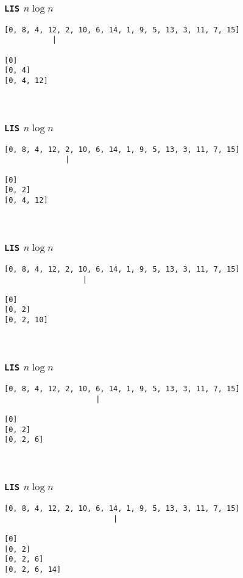 \documentclass{beamer}
\begin{document}
\begin{frame}[fragile]
	\frametitle{\texttt{LIS} $n\log n$}
\begin{verbatim}
[0, 8, 4, 12, 2, 10, 6, 14, 1, 9, 5, 13, 3, 11, 7, 15]
           |

[0]
[0, 4]
[0, 4, 12]



\end{verbatim}
\end{frame}
\addtocounter{framenumber}{-1}

\begin{frame}[fragile]
	\frametitle{\texttt{LIS} $n\log n$}
\begin{verbatim}
[0, 8, 4, 12, 2, 10, 6, 14, 1, 9, 5, 13, 3, 11, 7, 15]
              |

[0]
[0, 2]
[0, 4, 12]



\end{verbatim}
\end{frame}
\addtocounter{framenumber}{-1}

\begin{frame}[fragile]
	\frametitle{\texttt{LIS} $n\log n$}
\begin{verbatim}
[0, 8, 4, 12, 2, 10, 6, 14, 1, 9, 5, 13, 3, 11, 7, 15]
                  |

[0]
[0, 2]
[0, 2, 10]



\end{verbatim}
\end{frame}
\addtocounter{framenumber}{-1}

\begin{frame}[fragile]
	\frametitle{\texttt{LIS} $n\log n$}
\begin{verbatim}
[0, 8, 4, 12, 2, 10, 6, 14, 1, 9, 5, 13, 3, 11, 7, 15]
                     |

[0]
[0, 2]
[0, 2, 6]



\end{verbatim}
\end{frame}
\addtocounter{framenumber}{-1}

\begin{frame}[fragile]
	\frametitle{\texttt{LIS} $n\log n$}
\begin{verbatim}
[0, 8, 4, 12, 2, 10, 6, 14, 1, 9, 5, 13, 3, 11, 7, 15]
                         |

[0]
[0, 2]
[0, 2, 6]
[0, 2, 6, 14]


\end{verbatim}
\end{frame}
\addtocounter{framenumber}{-1}
\end{document}
